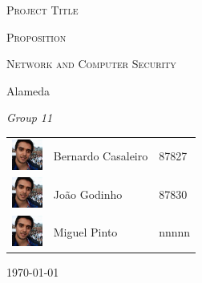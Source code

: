 \documentclass[a4paper,titlepage,11pt]{article}
\begin{document}
\begin{titlepage}
\begin{center}
  {\scshape \huge Project Title \par}                                                                         %
  \vspace{1cm}

  {\scshape \LARGE Proposition \par}
  \vspace{1.5cm}

  {\scshape \Large Network and Computer Security \par}
  \vspace{0.5cm}

  {\Large Alameda \par}
  \vfill

  {\itshape \Large Group 11 \par}
  \vfill

\begin{tabular}{l l l}
  \includegraphics[width=10mm, height=10mm]{img/bernardo.jpeg} & Bernardo Casaleiro & 87827\\
  \includegraphics[width=10mm, height=10mm]{img/bernardo.jpeg} & João Godinho & 87830\\                       %
  \includegraphics[width=10mm, height=10mm]{img/bernardo.jpeg} & Miguel Pinto & nnnnn\\                       %
\end{tabular}
  \vfill

{\large \today\par}
\end{center}
\end{titlepage}
\end{document}
